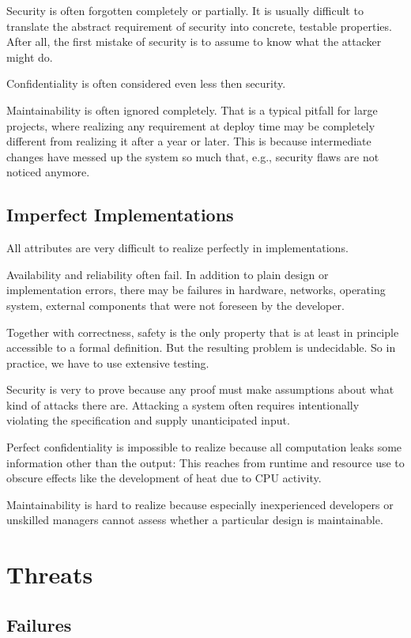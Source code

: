 Security is often forgotten completely or partially.
It is usually difficult to translate the abstract requirement of security into concrete, testable properties.
After all, the first mistake of security is to assume to know what the attacker might do.

Confidentiality is often considered even less then security.

Maintainability is often ignored completely.
That is a typical pitfall for large projects, where realizing any requirement at deploy time may be completely different from realizing it after a year or later.
This is because intermediate changes have messed up the system so much that, e.g., security flaws are not noticed anymore.

\subsection{Imperfect Implementations}

All attributes are very difficult to realize perfectly in implementations.

Availability and reliability often fail.
In addition to plain design or implementation errors, there may be failures in hardware, networks, operating system, external components that were not foreseen by the developer.

Together with correctness, safety is the only property that is at least in principle accessible to a formal definition.
But the resulting problem is undecidable.
So in practice, we have to use extensive testing. 

Security is very to prove because any proof must make assumptions about what kind of attacks there are.
Attacking a system often requires intentionally violating the specification and supply unanticipated input.

Perfect confidentiality is impossible to realize because all computation leaks some information other than the output: This reaches from runtime and resource use to obscure effects like the development of heat due to CPU activity.

Maintainability is hard to realize because especially inexperienced developers or unskilled managers cannot assess whether a particular design is maintainable.

\section{Threats}

\subsection{Failures}

